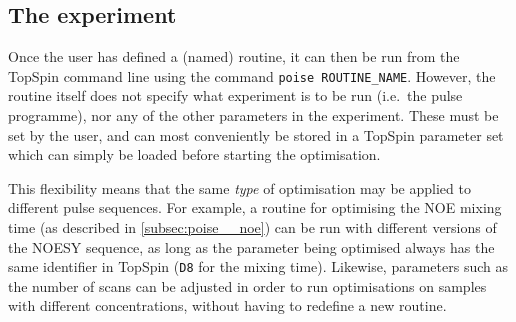\subsection{The experiment}
\label{subsec:poise__experiment}

Once the user has defined a (named) routine, it can then be run from the TopSpin command line using the command \texttt{poise ROUTINE\_NAME}.
However, the routine itself does not specify what experiment is to be run (i.e.\ the pulse programme), nor any of the other parameters in the experiment.
These must be set by the user, and can most conveniently be stored in a TopSpin parameter set which can simply be loaded before starting the optimisation.

This flexibility means that the same \textit{type} of optimisation may be applied to different pulse sequences.
For example, a routine for optimising the NOE mixing time (as described in \cref{subsec:poise__noe}) can be run with different versions of the NOESY sequence, as long as the parameter being optimised always has the same identifier in TopSpin (\texttt{D8} for the mixing time).
Likewise, parameters such as the number of scans can be adjusted in order to run optimisations on samples with different concentrations, without having to redefine a new routine.

